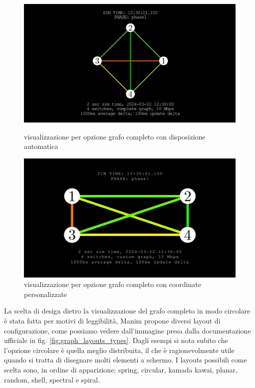 \documentclass[binding=0.6cm]{sapthesis}
\begin{document}
\begin{figure}[h]
    \centering
    \begin{minipage}{0.46\textwidth}
      \includegraphics[width=\linewidth]{immagini/custom_complete_autopositioning.JPG}
      \caption{visualizzazione per opzione grafo completo con disposizione automatica}
      \label{fig:custom_complete_autopositioning}
    \end{minipage}\hfill
    \begin{minipage}{0.47\textwidth}
      \includegraphics[width=\linewidth]{immagini/custom_complete_manual_positioning.JPG}
      \caption{visualizzazione per opzione grafo completo con coordinate personalizzate}
      \label{fig:custom_complete_manual_positioning}
    \end{minipage}
\end{figure}


La scelta di design dietro la visualizzazione del grafo completo in modo circolare è stata fatta per motivi di leggibilità, Manim propone diversi
layout di configurazione, come possiamo vedere dall'immagine presa dalla documentazione ufficiale \cite{manimGraph} in fig. \ref{fig:graph_layouts_types}. Dagli esempi
si nota subito che l'opzione circolare è quella meglio distribuita, il che è ragionevolmente utile quando si tratta di disegnare molti elementi a schermo. 
I layouts possibili come scelta sono, in ordine di apparizione; spring, circular, kamada kawai, planar, random, shell, spectral e spiral.
\end{document}
